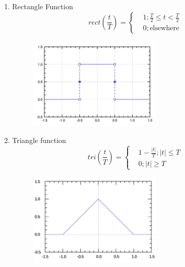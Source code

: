 \documentclass{article}
\begin{document}
\begin{enumerate}
\begin{figure}[h]
        \label{fig:enter-label}
    \end{figure}
    \newpage    
    \item Rectangle Function
    \begin{equation}
    rect(\frac{t}{T}) = 
        \begin{cases}
            & 1; \frac{T}{2}\leq t < \frac{T}{2} \\
            & 0; \text{elsewhere}
        \end{cases}
    \end{equation}
    \begin{figure}[h]
        \centering
        \includegraphics[width=0.6\textwidth]{image/1920px-Rectangular_function.svg.png}
        \label{fig:enter-label}
    \end{figure}
    \item Triangle function
    \begin{equation}
    tri(\frac{t}{T}) = 
        \begin{cases}
            & 1-\frac{|t|}{T};  |t|\leq T \\
            & 0;                |t|\geq T
        \end{cases}
    \end{equation}
    \begin{figure}[h]
        \centering
        \includegraphics[width=0.6\textwidth]{image/Triangular_function.svg.png}
        \label{fig:enter-label}
    \end{figure}

\end{enumerate}
\end{document}
